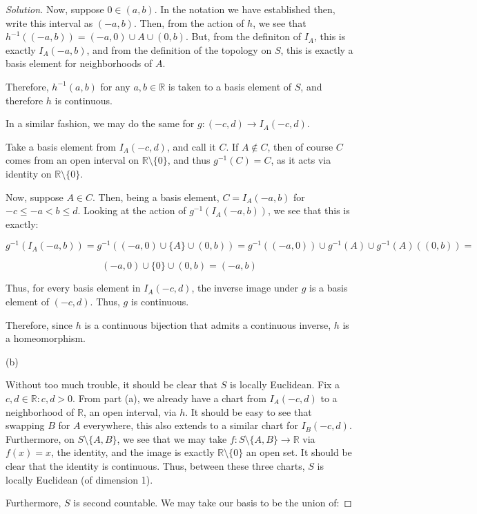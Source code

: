 \documentclass[10pt]{article}
\begin{document}
\begin{proof}[Solution]
Now, suppose $0 \in (a,b)$. In the notation we have established then, write this interval as $(-a,b)$. Then, from the action of $h$, we see that $h^{-1}((-a,b)) = (-a,0) \cup A \cup (0,b)$. But, from the definiton of $I_A$, this is exactly $I_A(-a,b)$, and from the definition of the topology on $S$, this is exactly a basis element for neighborhoods of $A$.

Therefore, $h^{-1}(a,b)$ for any $a,b\in \mathbb{R}$ is taken to a basis element of $S$, and therefore $h$ is continuous.

In a similar fashion, we may do the same for $g: (-c,d) \to I_A(-c,d)$.

Take a basis element from $I_A(-c,d)$, and call it $C$. If $A \not \in C$, then of course $C$ comes from an open interval on $\mathbb{R} \setminus \{ 0 \}$, and thus $g^{-1}(C) = C$, as it acts via identity on $\mathbb{R} \setminus \{ 0 \}$.

Now, suppose $A \in C$. Then, being a basis element, $C = I_A(-a,b)$ for $-c \leq -a <  b \leq d$. Looking at the action of $g^{-1}(I_A(-a,b))$, we see that this is exactly:

$$ g^{-1}(I_A(-a,b)) = g^{-1}((-a, 0) \cup \{ A \} \cup (0, b)) =  g^{-1}((-a, 0)) \cup  g^{-1}(A)  \cup  g^{-1}(A)((0, b))=$$

$$ (-a,0) \cup \{ 0 \} \cup (0,b) = (-a,b)$$

Thus, for every basis element in  $I_A(-c,d)$, the inverse image under $g$ is a basis element of $(-c,d)$. Thus, $g$ is continuous.

Therefore, since $h$ is a continuous bijection that admits a continuous inverse, $h$ is a homeomorphism.

(b)

Without too much trouble, it should be clear that $S$ is locally Euclidean. Fix a $c,d \in \mathbb{R} : c,d > 0$. From part (a), we already have a chart from $I_A(-c,d)$ to a neighborhood of $\mathbb{R}$, an open interval, via $h$. It should be easy to see that swapping $B$ for $A$ everywhere, this also extends to a similar chart for $I_B(-c,d)$. Furthermore, on $S \setminus \{ A, B \}$, we see that we may take $f: S \setminus \{ A, B \} \to \mathbb{R}$ via $f(x) = x$, the identity, and the image is exactly $\mathbb{R} \setminus \{ 0 \}$ an open set. It should be clear that the identity is continuous. Thus, between these three charts, $S$ is locally Euclidean (of dimension 1).

Furthermore, $S$ is second countable. We may take our basis to be the union of:


\end{proof}
\end{document}
